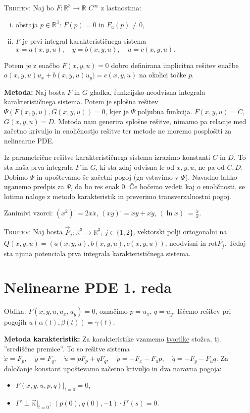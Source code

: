 \documentclass[8pt,a4paper]{amsart}
\theoremstyle{definition} %
\theoremstyle{plain} %
\newcommand{\R}{\mathbb R}
\begin{document}
\textsc{Trditev:} Naj bo $F : \R^3 \longrightarrow \R$ $C^{\infty}$ z
lastnostma:
\begin{enumerate}[(i)]
  \item obstaja $p \in \R^3$: $F(p)=0$ in
    $F_u(p) \neq 0$,
  \item $F$ je prvi integral karakterističnega sistema $
      \dot{x} =a(x,y,u),\quad \dot{y} =b(x,y,u) ,\quad \dot{u} =c(x,y,u).$
\end{enumerate}
Potem je z enačbo $F(x,y,u)=0 $ dobro definirana implicitna
  rešitev enačbe $a(x,y,u)u_x + b(x,y,u)u_y )= c(x,y,u)$ na okolici točke $p$.

\textbf{Metoda:} Naj bosta $F$ in $G$ gladka, funkcijsko neodvisna integrala
karakterističnega sistema. Potem je splošna rešitev $\Psi (F(x,y,u),G(x,y,u)) =
0$, kjer je $\Psi$ poljubna funkcija. $F(x,y,u) = C$, $G(x,y,u) = D$. Metoda nam
generira splošne rešitve, nimamo pa relacije med začetno krivuljo in
enoličnostjo rešitve ter metode ne moremo posplošiti za nelinearne PDE.

Iz parametrične rešitve karakterističnega sistema izrazimo konstanti $C$ in $D$.
To sta naša prva integrala $F$ in $G$, ki sta zdaj odvisna le od $x,y,u$, ne pa
od $C,D$. Dobimo $\Psi$ in upoštevamo še začetni pogoj (ga vstavimo v $\Psi$).
Navadno lahko uganemo predpis za $\Psi$, da bo res enak 0. Če hočemo vedeti kaj
o enoličnosti, se lotimo naloge z metodo karakteristik in preverimo
transverzalnostni pogoj.

Zanimivi vzorci: $(x^2)^. = 2x\dot{x}$, $(xy)^. = \dot{x}y + x\dot{y}$,
$(\ln{x})^. = \frac{\dot{x}}{x}$.

\textsc{Trditev:} Naj bosta $\vec{P}_j:\R^3 \longrightarrow \R^3$, $j \in
\{1,2\}$, vektorski polji ortogonalni na $Q(x,y,u) =
(a(x,y,u),b(x,y,u),c(x,y,u))$, neodvisni in $\text{rot}\vec{P}_j$. Tedaj sta
njuna potenciala prva integrala karakterističnega sistema.


\section*{Nelinearne PDE 1. reda}

Oblika: $F(x,y,u, u_x,u_y) = 0$, označimo $p = u_x$, $q = u_y$. Iščemo rešitev
pri pogojih $u(\alpha(t),\beta(t)) = \gamma(t)$.

\textbf{Metoda karakteristik:} Za karakteristike vzamemo \underline{tvorilke}
stožca, tj. ''središčne premice''. To so rešitve sistema $ \dot{x} =F_p ,\quad
\dot{y} =F_q ,\quad \dot{u} =pF_p + qF_q,\quad \dot{p} =-F_x - F_u p,\quad
\dot{q} =-F_y - F_u q.  $ Za določanje konstant upoštevamo začetno krivuljo in
dva naravna pogoja: \begin{itemize} \item $F(x,y,u,p,q)|_{t=0} = 0$, \item
      $\Gamma' \perp \vec{n}|_{t=0}$: $(p(0),q(0),-1) \cdot \Gamma'(s) = 0$.
  \end{itemize}
\end{document}
